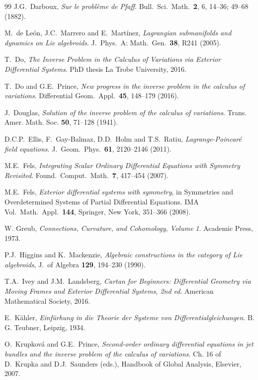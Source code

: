 \documentclass[11pt]{article}
\theoremstyle{plain}
\theoremstyle{definition}
\begin{document}
\begin{thebibliography}{99}
 J.G.\ Darboux, {\em Sur le probl{\`e}me de Pfaff}. Bull.\ Sci.\ Math.\ \textbf{2}, 6, 14--36; 49--68 (1882).

 M.\ de Le{\'o}n, J.C.\ Marrero and E.\ Mart{\'i}nez, {\em Lagrangian submanifolds and dynamics on Lie algebroids}. J.\ Phys.\ A: Math.\ Gen.\ \textbf{38}, R241 (2005).

 T.\ Do, {\em The Inverse Problem in the Calculus of Variations via Exterior Differential Systems}. PhD thesis La Trobe University, 2016.

 T.\ Do and G.E.\ Prince, {\em New progress in the inverse problem in the calculus of variations}. 
Differential Geom.\ Appl.\ \textbf{45}, 148–179 (2016).

 J.\ Douglas, {\em  Solution of the inverse problem of the calculus of variations}. Trans. Amer. Math.
Soc. \textbf{50}, 71--128  (1941).


 D.C.P.\ Ellis, F.\ Gay-Balmaz, D.D.\ Holm and T.S.\ Ratiu, {\em Lagrange-Poincar{\'e} field equations}. J.\ Geom.\ Phys.\ \textbf{61}, 2120--2146 (2011).

 M.E.\ Fels, \emph{Integrating Scalar Ordinary Differential Equations with Symmetry Revisited}. Found.\ Comput.\ Math.\ \textbf{7}, 417--454 (2007).

 M.E.\ Fels, \emph{Exterior differential systems with symmetry}, in Symmetries and Overdetermined Systems of
Partial Differential Equations. IMA Vol.\ Math.\ Appl.\ \textbf{144}, Springer, New York, 351--366 (2008).

 W. Greub, {\em Connections, Curvature, and Cohomology, Volume 1}. Academic Press, 1973.

 P.J.\ Higgins and K.\ Mackenzie, {\em Algebraic constructions in the category of Lie
algebroids}, J.\ of Algebra \textbf{129}, 194--230 (1990).

 T.A.\ Ivey and J.M.\ Landsberg, {\em Cartan for Beginners: Differential Geometry via Moving Frames and Exterior Differential Systems, 2nd ed}. American Mathematical Society, 2016.

 E.\ K{\"a}hler, {\em Einf{\"u}rhung in die Theorie der Systeme von Differentialgleichungen}. B. G. Teubner, Leipzig, 1934.

 O.\ Krupkov{\'a} and G.E.\ Prince, {\em Second-order ordinary differential equations in jet bundles and the inverse problem of the calculus of variations}. Ch. 16 of D.\ Krupka and D.J.\ Saunders (eds.), Handbook of Global Analysis, Elsevier, 2007.


\end{thebibliography}
\end{document}
